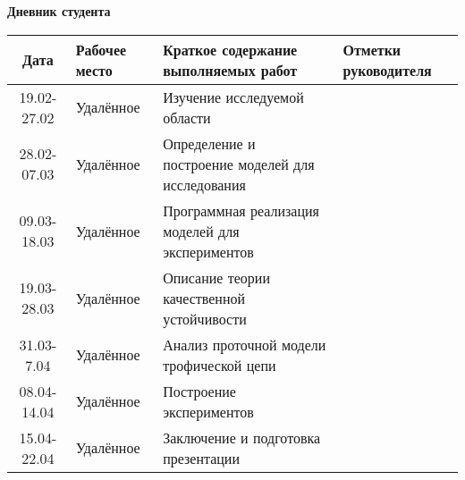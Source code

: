 \begin{center}
    \textbf{Дневник студента}

    \begin{tabular}{|c|m{2.4cm}|m{8cm}|m{3cm}|}
        \hline
        Дата & 
        Рабочее \newline место & 
        Краткое содержание \newline выполняемых работ & 
        Отметки \newline руководителя \\
        \hline
        19.02-27.02 & 
        Удалённое  & 
        Изучение исследуемой области  & 
         \\
        \hline
        28.02-07.03 & 
        Удалённое  & 
        Определение и построение моделей для исследования & 
         \\
        \hline
        09.03-18.03 & 
        Удалённое  & 
        Программная реализация моделей для экспериментов & 
         \\
        \hline
        19.03-28.03 & 
        Удалённое  & 
        Описание теории качественной устойчивости & 
         \\
        \hline
        31.03-7.04 & 
        Удалённое  & 
        Анализ проточной модели трофической цепи & 
         \\
        \hline
        08.04-14.04 & 
        Удалённое  & 
        Построение экспериментов & 
         \\
        \hline
        15.04-22.04 & 
        Удалённое  & 
        Заключение и подготовка презентации & 
         \\
        \hline
    \end{tabular}
\end{center}
